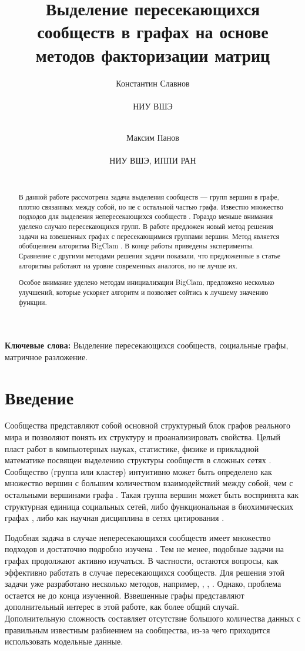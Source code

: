 \documentclass{ITaSconf}
\title{Выделение пересекающихся сообществ в графах на основе методов факторизации матриц}
\author{
	Константин Славнов \\
	\begin{affiliation}
		НИУ ВШЭ
	\end{affiliation}\\
	\email{kaslavnov@edu.hse.ru}
	\and
	Максим Панов \\
	\begin{affiliation}
		НИУ ВШЭ, ИППИ РАН
	\end{affiliation}\\
	\email{panov.maxim@gmail.com}
}
\begin{document}
	\maketitle
	
	\begin{abstract}
		В данной работе рассмотрена задача выделения сообществ --- групп вершин в графе, плотно связанных между собой, но не с остальной частью графа.
		Известно множество подходов для выделения непересекающихся сообществ \cite{Fortunato10}.
		Гораздо меньше внимания уделено случаю пересекающихся групп.
		В работе предложен новый метод решения задачи на взвешенных графах с пересекающимися группами вершин.
		Метод является обобщением алгоритма BigClam \cite{yang2013overlapping}.
		В конце работы приведены эксперименты.
		Сравнение с другими методами решения задачи показали, что предложенные в статье алгоритмы работают на уровне современных аналогов, но не лучше их.
		
		Особое внимание уделено методам инициализации BigClam, предложено несколько улучшений, которые ускоряет алгоритм и позволяет сойтись к лучшему значению функции.
	\end{abstract}
	
	\textbf{Ключевые слова:} Выделение пересекающихся сообществ, социальные графы, матричное разложение.
	
	\section{Введение}
	
	Сообщества представляют собой основной структурный блок графов реального мира и позволяют понять их структуру и проанализировать свойства.
	Целый пласт работ в компьютерных науках, статистике, физике и прикладной математике посвящен выделению структуры сообществ в сложных сетях \cite{Fortunato10}.
	Сообщество (группа или кластер) интуитивно может быть определено как множество вершин с большим количеством взаимодействий между собой, чем с остальными вершинами графа \cite{girvan2002community}.
	Такая группа вершин может быть воспринята как структурная единица социальных сетей, либо функциональная в биохимических графах \cite{krogan2006global}, либо как научная дисциплина в сетях цитирования \cite{backstrom2006group}.
	
	Подобная задача в случае непересекающихся сообществ имеет множество подходов и достаточно подробно изучена \cite{Fortunato10}.
	Тем не менее, подобные задачи на графах продолжают активно изучаться.
	В частности, остаются вопросы, как эффективно работать в случае пересекающихся сообществ.
	Для решения этой задачи уже разработано несколько методов, например, \cite{airoldi2008mixed}, \cite{palla2005uncovering}, \cite{gregory2010finding}.
	Однако, проблема остается не до конца изученной.
	Взвешенные графы представляют дополнительный интерес в этой работе, как более общий случай.
	Дополнительную сложность составляет отсутствие большого количества данных с правильным известным разбиением на сообщества, из-за чего приходится использовать модельные данные.
	
\end{document}
